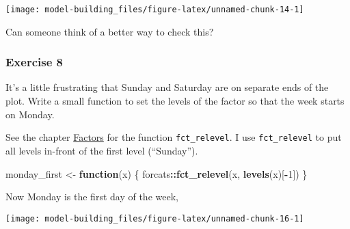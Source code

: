 \documentclass[]{book}
\newenvironment{Shaded}{\begin{snugshade}}{\end{snugshade}}
\newcommand{\ControlFlowTok}[1]{\textcolor[rgb]{0.13,0.29,0.53}{\textbf{#1}}}
\newcommand{\DataTypeTok}[1]{\textcolor[rgb]{0.13,0.29,0.53}{#1}}
\newcommand{\DecValTok}[1]{\textcolor[rgb]{0.00,0.00,0.81}{#1}}
\newcommand{\KeywordTok}[1]{\textcolor[rgb]{0.13,0.29,0.53}{\textbf{#1}}}
\newcommand{\NormalTok}[1]{#1}
\newcommand{\OperatorTok}[1]{\textcolor[rgb]{0.81,0.36,0.00}{\textbf{#1}}}
\newcommand{\OtherTok}[1]{\textcolor[rgb]{0.56,0.35,0.01}{#1}}
\newcommand{\StringTok}[1]{\textcolor[rgb]{0.31,0.60,0.02}{#1}}
\theoremstyle{plain}
\theoremstyle{remark}
\theoremstyle{definition}
\theoremstyle{definition}
\theoremstyle{definition}
\theoremstyle{remark}
\begin{document}
\begin{center}\texttt{[image: model-building\_files/figure-latex/unnamed-chunk-14-1]} \end{center}

Can someone think of a better way to check this?

\hypertarget{exercise-8}{%
\subsubsection{Exercise 8}\label{exercise-8}}

It's a little frustrating that Sunday and Saturday are on separate ends
of the plot. Write a small function to set the levels of the factor so
that the week starts on Monday.

See the chapter \href{http://r4ds.had.co.nz/factors.html}{Factors} for
the function \texttt{fct\_relevel}. I use \texttt{fct\_relevel} to put
all levels in-front of the first level (``Sunday'').

\begin{Shaded}
\begin{Highlighting}[]
\NormalTok{monday_first <-}\StringTok{ }\ControlFlowTok{function}\NormalTok{(x) \{}
\NormalTok{  forcats}\OperatorTok{::}\KeywordTok{fct_relevel}\NormalTok{(x, }\KeywordTok{levels}\NormalTok{(x)[}\OperatorTok{-}\DecValTok{1}\NormalTok{])  }
\NormalTok{\}}
\end{Highlighting}
\end{Shaded}

Now Monday is the first day of the week,

\begin{Shaded}
\end{Shaded}

\begin{center}\texttt{[image: model-building\_files/figure-latex/unnamed-chunk-16-1]} \end{center}
\end{document}
